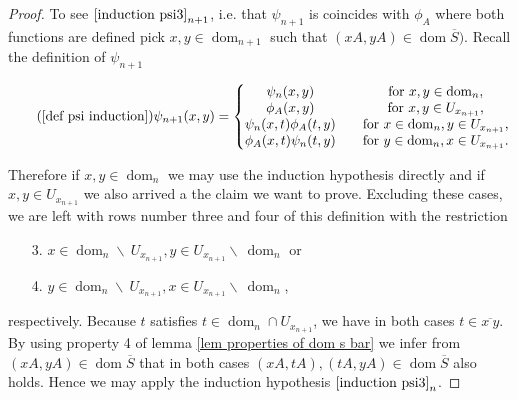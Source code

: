 \documentclass[b5paper,draft,openbib,12pt]{memoir}
\DeclareMathOperator{\dom}{dom}
\begin{document}
\begin{proof}
To see \(\eqref{induction psi3}_{n+1}\), i.e. that  \(\psi_{n+1}\) is 
coincides with \(\phi_A\) where both functions are defined pick 
\(x,y\in \dom_{n+1}\) such that \((xA,yA)\in\dom\overline{S})\).
Recall the definition of \(\psi_{n+1}\)

\begin{equation}\tag{\ref{def psi induction}}
  \psi_{n+1}(x,y)=\left\{\begin{matrix}
  \psi_n(x,y) \quad &\text{for }x,y\in \dom_n,\\
  \phi_A(x,y) \quad &\text{for } x,y\in U_{x_{n+1}},\\
  \psi_n(x,t)\phi_A(t,y)\quad &\text{for } x\in \dom_n, y\in U_{x_{n+1}},\\
  \phi_A(x,t)\psi_n(t,y)\quad &\text{for } y\in \dom_n, x\in U_{x_{n+1}}.
  \end{matrix} \right.
\end{equation} 

Therefore if \(x,y\in\dom_{n}\) we may use the induction hypothesis directly
and if \(x,y\in U_{x_{n+1}}\) we also arrived a the claim we want to prove.
Excluding these cases, we are left with rows number three and four of this
definition with the restriction
\begin{enumerate}
  \item[3.] \(x\in \dom_n\backslash~ U_{x_{n+1}}, y\in U_{x_{n+1}}\backslash~ \dom_n \) or
  \item[4.] \(y\in \dom_n\backslash~ U_{x_{n+1}}, x\in U_{x_{n+1}}\backslash~ \dom_n \),
\end{enumerate}
respectively.
Because \(t\) satisfies
\(t\in \dom_n\cap U_{x_{n+1}}\), we have in both cases \(t\in \overline{x~y}\).
By using property 4 of lemma \ref{lem properties of dom s bar} we infer 
from \((xA,yA)\in \dom\overline{S}\) that in both cases
 \((xA, t A),(tA, y A)\in \dom \overline{S}\)
also holds. Hence we may apply the induction hypothesis 
\(\eqref{induction psi3}_{n}\).


\end{proof}
\end{document}
